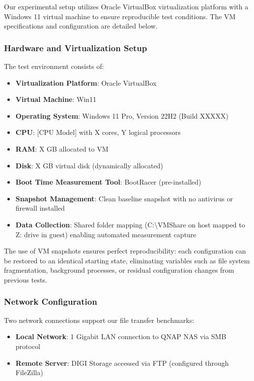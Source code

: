 \documentclass[runningheads,a4paper,english]{llncs}[2022/01/12]
\begin{document}
Our experimental setup utilizes Oracle VirtualBox virtualization platform with a Windows 11 virtual machine to ensure reproducible test conditions. The VM specifications and configuration are detailed below.

\subsubsection{Hardware and Virtualization Setup}

The test environment consists of:
\begin{itemize}
\item \textbf{Virtualization Platform}: Oracle VirtualBox
\item \textbf{Virtual Machine}: Win11
\item \textbf{Operating System}: Windows 11 Pro, Version 22H2 (Build XXXXX)
\item \textbf{CPU}: [CPU Model] with X cores, Y logical processors
\item \textbf{RAM}: X GB allocated to VM
\item \textbf{Disk}: X GB virtual disk (dynamically allocated)
\item \textbf{Boot Time Measurement Tool}: BootRacer (pre-installed)
\item \textbf{Snapshot Management}: Clean baseline snapshot with no antivirus or firewall installed
\item \textbf{Data Collection}: Shared folder mapping (C:\textbackslash{}VMShare on host mapped to Z: drive in guest) enabling automated measurement capture
\end{itemize}

The use of VM snapshots ensures perfect reproducibility: each configuration can be restored to an identical starting state, eliminating variables such as file system fragmentation, background processes, or residual configuration changes from previous tests.

\subsubsection{Network Configuration}

Two network connections support our file transfer benchmarks:
\begin{itemize}
\item \textbf{Local Network}: 1 Gigabit LAN connection to QNAP NAS via SMB protocol
\item \textbf{Remote Server}: DIGI Storage accessed via FTP (configured through FileZilla)
\end{itemize}
\end{document}
